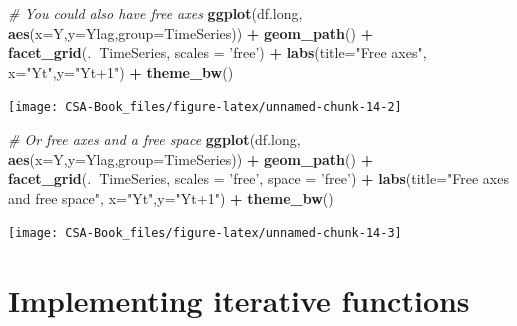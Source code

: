 \documentclass[12pt,]{book}
\newenvironment{Shaded}{\begin{snugshade}}{\end{snugshade}}
\newcommand{\CommentTok}[1]{\textcolor[rgb]{0.56,0.35,0.01}{\textit{#1}}}
\newcommand{\DataTypeTok}[1]{\textcolor[rgb]{0.13,0.29,0.53}{#1}}
\newcommand{\KeywordTok}[1]{\textcolor[rgb]{0.13,0.29,0.53}{\textbf{#1}}}
\newcommand{\NormalTok}[1]{#1}
\newcommand{\OperatorTok}[1]{\textcolor[rgb]{0.81,0.36,0.00}{\textbf{#1}}}
\newcommand{\StringTok}[1]{\textcolor[rgb]{0.31,0.60,0.02}{#1}}
\let\stdsection\section
\renewcommand\section{\newpage\stdsection}
\begin{document}
\begin{Shaded}
\begin{Highlighting}[]
\CommentTok{# You could also have free axes}
\KeywordTok{ggplot}\NormalTok{(df.long, }\KeywordTok{aes}\NormalTok{(}\DataTypeTok{x=}\NormalTok{Y,}\DataTypeTok{y=}\NormalTok{Ylag,}\DataTypeTok{group=}\NormalTok{TimeSeries)) }\OperatorTok{+}
\StringTok{  }\KeywordTok{geom_path}\NormalTok{() }\OperatorTok{+}\StringTok{ }
\StringTok{  }\KeywordTok{facet_grid}\NormalTok{(.}\OperatorTok{~}\NormalTok{TimeSeries, }\DataTypeTok{scales =} \StringTok{'free'}\NormalTok{) }\OperatorTok{+}
\StringTok{  }\KeywordTok{labs}\NormalTok{(}\DataTypeTok{title=}\StringTok{"Free axes"}\NormalTok{, }\DataTypeTok{x=}\StringTok{"Yt"}\NormalTok{,}\DataTypeTok{y=}\StringTok{"Yt+1"}\NormalTok{) }\OperatorTok{+}
\StringTok{  }\KeywordTok{theme_bw}\NormalTok{() }
\end{Highlighting}
\end{Shaded}

\begin{center}\texttt{[image: CSA-Book\_files/figure-latex/unnamed-chunk-14-2]} \end{center}

\begin{Shaded}
\begin{Highlighting}[]
\CommentTok{# Or free axes and a free space}
\KeywordTok{ggplot}\NormalTok{(df.long, }\KeywordTok{aes}\NormalTok{(}\DataTypeTok{x=}\NormalTok{Y,}\DataTypeTok{y=}\NormalTok{Ylag,}\DataTypeTok{group=}\NormalTok{TimeSeries)) }\OperatorTok{+}
\StringTok{  }\KeywordTok{geom_path}\NormalTok{() }\OperatorTok{+}\StringTok{ }
\StringTok{  }\KeywordTok{facet_grid}\NormalTok{(.}\OperatorTok{~}\NormalTok{TimeSeries, }\DataTypeTok{scales =} \StringTok{'free'}\NormalTok{, }\DataTypeTok{space =} \StringTok{'free'}\NormalTok{) }\OperatorTok{+}
\StringTok{  }\KeywordTok{labs}\NormalTok{(}\DataTypeTok{title=}\StringTok{"Free axes and free space"}\NormalTok{, }\DataTypeTok{x=}\StringTok{"Yt"}\NormalTok{,}\DataTypeTok{y=}\StringTok{"Yt+1"}\NormalTok{) }\OperatorTok{+}
\StringTok{  }\KeywordTok{theme_bw}\NormalTok{() }
\end{Highlighting}
\end{Shaded}

\begin{center}\texttt{[image: CSA-Book\_files/figure-latex/unnamed-chunk-14-3]} \end{center}

\hypertarget{implementing-iterative-functions}{%
\section{\texorpdfstring{\textbf{Implementing iterative functions}}{Implementing iterative functions}}\label{implementing-iterative-functions}}
\end{document}
